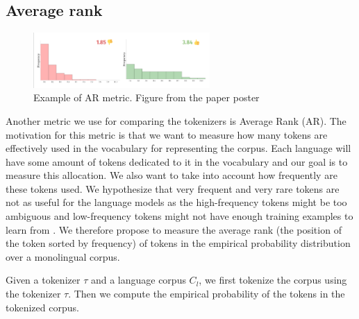 \subsection{Average rank}

\begin{figure}[h]
    \centering
    \includegraphics[width=0.6\textwidth]{img/temp/ar_example.png}
    \caption{Example of AR metric. Figure from the paper poster \cite{limisiewicz_tokenization_2023}}
    \label{fig:ar_example}
\end{figure}

Another metric we use for comparing the tokenizers is Average Rank (AR). The motivation for this metric is that we want to measure how many tokens are effectively used in the vocabulary for representing the corpus. Each language will have some amount of tokens dedicated to it in the vocabulary and our goal is to measure this allocation. We also want to take into account how frequently are these tokens used. We hypothesize that very frequent and very rare tokens are not as useful for the language models as the high-frequency tokens might be too ambiguous and low-frequency tokens might not have enough training examples to learn from \cite{gowda_finding_2020}. We therefore propose to measure the average rank (the position of the token sorted by frequency) of tokens in the empirical probability distribution over a monolingual corpus.

Given a tokenizer $\tau$ and a language corpus $C_l$, we first tokenize the corpus using the tokenizer $\tau$. Then we compute the empirical probability of the tokens in the tokenized corpus.

